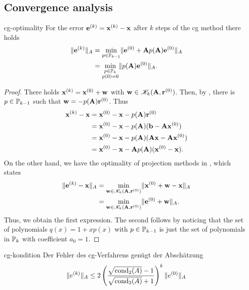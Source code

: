\subsection{Convergence analysis}

\begin{Lemma}{cg-optimality}
  For the error $\ve^{(k)} = \vx^{(k)}-\vx$ after $k$ steps of the cg
  method there holds
  \begin{align}
    \norm{\ve^{(k)}}_A
    & = \min_{p\in \P_{k-1}}
      \norm{\ve^{(0)} + \mata p(\mata) \ve^{(0)}}_A\\
    &= \min_{\substack{p\in\P_k\\p(0) = 0}} \norm{p(\mata)\ve^{(0)}}_A.
  \end{align}
\end{Lemma}

\begin{proof}
  There holds $\vx^{(k)} = \vx^{(0)} + \vw$ with
  $\vw \in \krylov_k(\mata,\vr^{(0)})$. Then, by
  , there is $p\in\P_{k-1}$ such
  that $\vw = -p(\mata) \vr^{(0)}$. Thus
  \begin{align}
    \vx^{(k)} - \vx
    &= \vx^{(0)} - \vx - p(\mata)\vr^{(0)}\\
    &= \vx^{(0)} - \vx - p(\mata) (\vb-\mata\vx^{(0)})\\
    &= \vx^{(0)} - \vx - p(\mata) (\mata\vx-\mata\vx^{(0)})\\
    &= \vx^{(0)} - \vx - \mata p(\mata) (\vx^{(0)}-\vx).
  \end{align}
  On the other hand, we have the optimality of projection methods in
  , which states
  \begin{align}
    \norm{\ve^{(k)} -\vx}_A
    &= \min_{\vw\in \krylov_k(\mata,\vr^{(0)})} \norm{\vx^{(0)}+\vw-\vx}_A\\
    &= \min_{\vw\in \krylov_k(\mata,\vr^{(0)})} \norm{\ve^{(0)}+\vw}_A.
  \end{align}
  Thus, we obtain the first expression. The second follows by noticing
  that the set of polynomials $q(x) = 1+xp(x)$ with $p\in\P_{k-1}$ is
  just the set of polynomials in $\P_k$ with coefficient $a_0 = 1$.
\end{proof}



\begin{Satz}{cg-kondition}
  Der Fehler des cg-Verfahrens genügt der Abschätzung
  \begin{gather}
    \norm{e^{(k)}}_A \le 2 \left(
      \frac{\sqrt{\cond_2(A)}-1}{\sqrt{\cond_2(A)}+1}\right)^k
    \norm{e^{(0)}}_A
  \end{gather}
\end{Satz}

